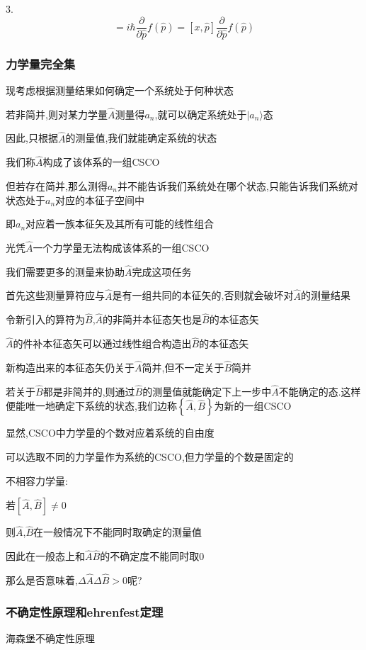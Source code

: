\documentclass[lang=cn,10pt]{elegantbook}
\begin{document}
3.\begin{equation*}
	[x,f(\hat{p})]=i\hbar \frac{\partial}{\partial \hat{p}}f\left( \hat{p} \right) =\left[ x,\hat{p} \right] \frac{\partial}{\partial \hat{p}}f\left( \hat{p} \right) 
\end{equation*}
\subsubsection{力学量完全集}

现考虑根据测量结果如何确定一个系统处于何种状态

若非简并,则对某力学量$\hat{A}$测量得$a_n$,就可以确定系统处于$|a_n\rangle$态

因此,只根据$\hat{A}$的测量值,我们就能确定系统的状态

我们称$\hat{A}$构成了该体系的一组CSCO

但若存在简并,那么测得$a_n$并不能告诉我们系统处在哪个状态,只能告诉我们系统对状态处于$a_n$对应的本征子空间中

即$a_n$对应着一族本征矢及其所有可能的线性组合

光凭$\hat{A}$一个力学量无法构成该体系的一组CSCO

我们需要更多的测量来协助$\hat{A}$完成这项任务

首先这些测量算符应与$\hat{A}$是有一组共同的本征矢的,否则就会破坏对$\hat{A}$的测量结果

令新引入的算符为$\hat{B}$,$\hat{A}$的非简并本征态矢也是$\hat{B}$的本征态矢

$\hat{A}$的件补本征态矢可以通过线性组合构造出$\hat{B}$的本征态矢

新构造出来的本征态矢仍关于$\hat{A}$简并,但不一定关于$\hat{B}$简并

若关于$\hat{B}$都是非简并的,则通过$\hat{B}$的测量值就能确定下上一步中$\hat{A}$不能确定的态.这样便能唯一地确定下系统的状态,我们边称$ \left\lbrace \hat{A},\hat{B}\right\rbrace $为新的一组CSCO

显然,CSCO中力学量的个数对应着系统的自由度

可以选取不同的力学量作为系统的CSCO,但力学量的个数是固定的

不相容力学量:

若$[ \hat{A} ,\hat{B} ]\ne 0$

则$\hat{A}$,$\hat{B}$在一般情况下不能同时取确定的测量值

因此在一般态上和$\hat{A}$$\hat{B}$的不确定度不能同时取0

那么是否意味着,$\varDelta\hat{A}\varDelta\hat{B}>0$呢?
\subsubsection{不确定性原理和ehrenfest定理}
海森堡不确定性原理
\end{document}
